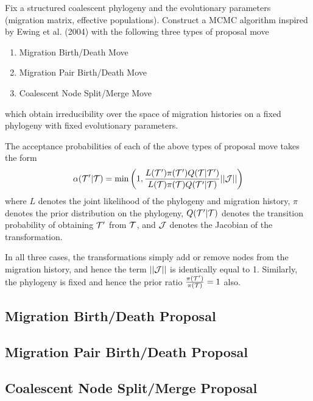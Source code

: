 Fix a structured coalescent phylogeny and the evolutionary parameters (migration matrix, effective populations). Construct a MCMC algorithm inspired by Ewing et al. (2004) with the following three types of proposal move
	\begin{enumerate}
		\item Migration Birth/Death Move
		\item Migration Pair Birth/Death Move
		\item Coalescent Node Split/Merge Move
	\end{enumerate}
which obtain irreducibility over the space of migration histories on a fixed phylogeny with fixed evolutionary parameters.

The acceptance probabilities of each of the above types of proposal move takes the form
	\begin{equation}
		\alpha(\mathcal{T}' | \mathcal{T}) = \min \left( 1, \frac{L(\mathcal{T}') \pi(\mathcal{T}') Q(\mathcal{T} | \mathcal{T}')}{L(\mathcal{T}) \pi(\mathcal{T}) Q(\mathcal{T}' | \mathcal{T})} || \mathcal{J} || \right)
	\end{equation}
where $L$ denotes the joint likelihood of the phylogeny and migration history, $\pi$ denotes the prior distribution on the phylogeny, $Q(\mathcal{T}' | \mathcal{T})$ denotes the transition probability of obtaining $\mathcal{T}'$ from $\mathcal{T}$, and $\mathcal{J}$ denotes the Jacobian of the transformation.

In all three cases, the transformations simply add or remove nodes from the migration history, and hence the term $||\mathcal{J}||$ is identically equal to 1. Similarly, the phylogeny is fixed and hence the prior ratio $\frac{\pi(\mathcal{T}')}{\pi(\mathcal{T})} = 1$ also.

\subsection{Migration Birth/Death Proposal}
	
	
\subsection{Migration Pair Birth/Death Proposal}
	
	
\subsection{Coalescent Node Split/Merge Proposal}
	
	
